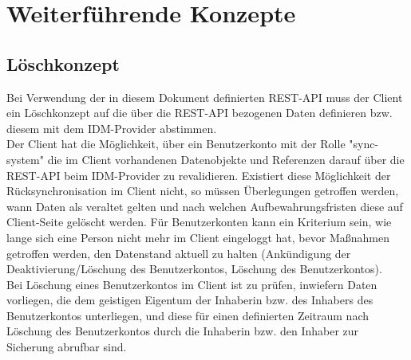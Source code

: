\chapter{Weiterführende Konzepte}

\section{Löschkonzept}

Bei Verwendung der in diesem Dokument definierten REST-API muss der Client ein Löschkonzept auf die über die REST-API bezogenen Daten definieren bzw. diesem mit dem IDM-Provider abstimmen.\\

Der Client hat die Möglichkeit, über ein Benutzerkonto mit der Rolle "sync-system" die im Client vorhandenen Datenobjekte und Referenzen darauf über die REST-API beim IDM-Provider zu revalidieren. 
Existiert diese Möglichkeit der Rücksynchronisation im Client nicht, so müssen Überlegungen getroffen werden, wann Daten als veraltet gelten und nach welchen Aufbewahrungsfristen diese auf Client-Seite gelöscht werden. 
Für Benutzerkonten kann ein Kriterium sein, wie lange sich eine Person nicht mehr im Client eingeloggt hat, bevor Maßnahmen getroffen werden, den Datenstand aktuell zu halten (Ankündigung der Deaktivierung/Löschung des Benutzerkontos, Löschung des Benutzerkontos). \\

Bei Löschung eines Benutzerkontos im Client ist zu prüfen, inwiefern Daten vorliegen, die dem geistigen Eigentum der Inhaberin bzw. des Inhabers des Benutzerkontos unterliegen, und diese für einen definierten Zeitraum nach Löschung des Benutzerkontos durch die Inhaberin bzw. den Inhaber zur Sicherung abrufbar sind.